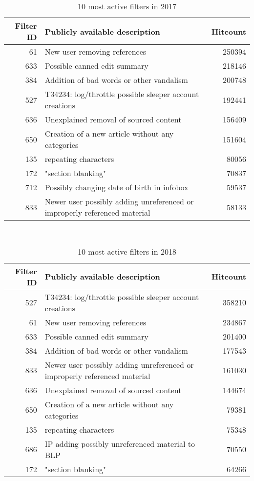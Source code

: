\begin{table}
  \centering
  \begin{tabular}{r p{9cm} r }
    Filter ID & Publicly available description & Hitcount \\
    \hline
    61 & New user removing references & 250394 \\
    633 & Possible canned edit summary & 218146 \\
    384 & Addition of bad words or other vandalism & 200748 \\
    527 & T34234: log/throttle possible sleeper account creations & 192441 \\
    636 & Unexplained removal of sourced content & 156409 \\
    650 & Creation of a new article without any categories & 151604 \\
    135 & repeating characters & 80056 \\
    172 & "section blanking" & 70837 \\
    712 & Possibly changing date of birth in infobox & 59537 \\
    833 & Newer user possibly adding unreferenced or improperly referenced material & 58133 \\
  \end{tabular}
  \caption{10 most active filters in 2017}~\label{tab:app-most-active-2017}
\end{table}

\begin{table}
  \centering
    \begin{tabular}{r p{9cm} r }
    Filter ID & Publicly available description & Hitcount \\
    \hline
    527 & T34234: log/throttle possible sleeper account creations & 358210 \\
    61 & New user removing references & 234867 \\
    633 & Possible canned edit summary & 201400 \\
    384 & Addition of bad words or other vandalism & 177543 \\
    833 & Newer user possibly adding unreferenced or improperly referenced material & 161030 \\
    636 & Unexplained removal of sourced content & 144674 \\
    650 & Creation of a new article without any categories & 79381 \\
    135 & repeating characters & 75348 \\
    686 & IP adding possibly unreferenced material to BLP & 70550 \\
    172 & "section blanking" & 64266 \\
  \end{tabular}
  \caption{10 most active filters in 2018}~\label{tab:app-most-active-2018}
\end{table}

